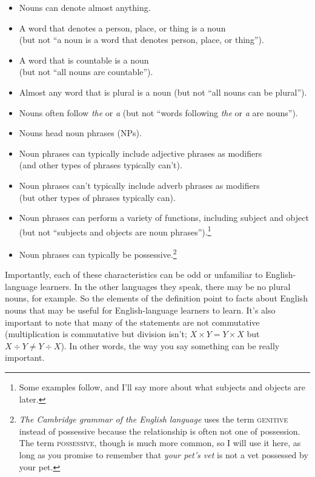 \begin{itemize}[noitemsep]
    \item Nouns can denote almost anything.
    \item A word that denotes a person, place, or thing is a noun \\(but not ``a noun is a word that denotes person, place, or thing'').
    \item A word that is countable is a noun \\(but not ``all nouns are countable'').
    \item Almost any word that is plural is a noun (but not ``all nouns can be plural'').
    \item Nouns often follow \textit{the} or \textit{a} (but not ``words following \textit{the} or \textit{a} are nouns'').
    \item Nouns head noun phrases (NPs).
    \item Noun phrases can typically include adjective phrases as modifiers \\(and other types of phrases typically can't).
    \item Noun phrases can't typically include adverb phrases as modifiers \\(but other types of phrases typically can).
    \item {}Noun phrases can perform a variety of functions, including subject and object (but not ``subjects and objects are noun phrases'').\footnote{Some examples follow, and I'll say more about what subjects and objects are later.}
    \item {}Noun phrases can typically be possessive.\footnote{\textit{The Cambridge grammar of the English language} uses the term \textsc{genitive} instead of possessive because the relationship is often not one of possession. The term \textsc{possessive}, though is much more common, so I will use it here, as long as you promise to remember that \textit{your pet's vet} is not a vet possessed by your pet.}
\end{itemize}

Importantly, each of these characteristics can be odd or unfamiliar to English-language learners. In the other languages they speak, there may be no plural nouns, for example. So the elements of the definition point to facts about English nouns that may be useful for English-language learners to learn. It's also important to note that many of the statements are not commutative (multiplication is commutative but division isn't; $X \times Y = Y \times X$ but $X \div Y \neq Y \div X$). In other words, the way you say something can be really important. 

